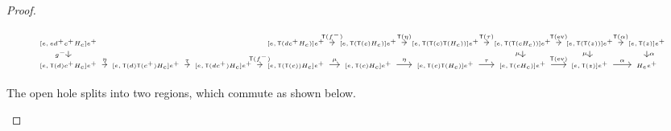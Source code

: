 \documentclass[11pt, oneside, article]{memoir}
\theoremstyle{definition}
\theoremstyle{plain}
\newcommand{\fun}[1]{\mathrm{#1}}%
\newcommand{\Fun}[1]{\mathsf{#1}}%
\newcommand{\ev}{\fun{ev}}
\newcommand{\inpt}[1]{#1^{-}}
\newcommand{\outp}[1]{#1^{+}}
\begin{document}
\begin{proof}
\begin{landscape}
\[\begin{tikzcd}[column sep=0.5em, row sep=0.6em, every label/.append style={font=\tiny}, font=\tiny, ampersand replacement=\&]
{[e,e\outp d\outp c H_c]}\outp e \ar[d, "{\inpt g}"']
\&\&
\& {[e,\Fun T(d\outp c H_c)]}\outp e \ar[r, "{\Fun T(\inpt f)}"]
\& {[e,\Fun T(\Fun T(c)H_c)]}\outp e \ar[r, "{\Fun T(\eta)}"]
\& {[e,\Fun T(\Fun T(c)\Fun T(H_c))]}\outp e \ar[r, "{\Fun T(\tau)}"]
\& {[e,\Fun T(\Fun T(cH_c))]}\outp e \ar[r, "{\Fun T(\ev)}"] \ar[d, "{\mu}"']
\& {[e,\Fun T(\Fun T(z))]}\outp e \ar[r, "{\Fun T(\alpha)}"] \ar[d, "{\mu}"']
\& {[e,\Fun T(z)]}\outp e \ar[d, "{\alpha}"] \\
{[e,\Fun T(d)\outp c H_c]}\outp e \ar[r, "{\eta}"]
\& {[e,\Fun T(d)\Fun T(\outp c)H_c]}\outp e \ar[r, "{\tau}"]
\& {[e,\Fun T(d\outp c)H_c]}\outp e \ar[r, "{\Fun T(\inpt f)}"]
\& {[e,\Fun T(\Fun T(c))H_c]}\outp e \ar[r, "{\mu}"]
\& {[e,\Fun T(c)H_c]}\outp e \ar[r, "{\eta}"]
\& {[e,\Fun T(c)\Fun T(H_c)]}\outp e \ar[r, "{\tau}"]
\& {[e,\Fun T(cH_c)]}\outp e \ar[r, "{\Fun T(\ev)}"]
\& {[e,\Fun T(z)]}\outp e \ar[r, "{\alpha}"]
\& H_e\outp e
\end{tikzcd}
\]

\medskip

The open hole splits into two regions, which commute as shown below.


\end{landscape}
\end{proof}
\end{document}
